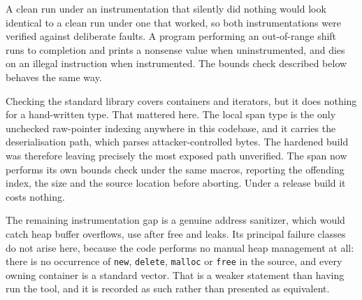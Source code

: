A clean run under an instrumentation that silently did nothing would look
identical to a clean run under one that worked, so both instrumentations were
verified against deliberate faults. A program performing an out-of-range shift
runs to completion and prints a nonsense value when uninstrumented, and dies on
an illegal instruction when instrumented. The bounds check described below
behaves the same way.

Checking the standard library covers containers and iterators, but it does
nothing for a hand-written type. That mattered here. The local span type is the
only unchecked raw-pointer indexing anywhere in this codebase, and it carries
the deserialisation path, which parses attacker-controlled bytes. The hardened
build was therefore leaving precisely the most exposed path unverified. The
span now performs its own bounds check under the same macros, reporting the
offending index, the size and the source location before aborting. Under a
release build it costs nothing.

The remaining instrumentation gap is a genuine address sanitizer, which would
catch heap buffer overflows, use after free and leaks. Its principal failure
classes do not arise here, because the code performs no manual heap management
at all: there is no occurrence of \texttt{new}, \texttt{delete},
\texttt{malloc} or \texttt{free} in the source, and every owning container is a
standard vector. That is a weaker statement than having run the tool, and it is
recorded as such rather than presented as equivalent.
